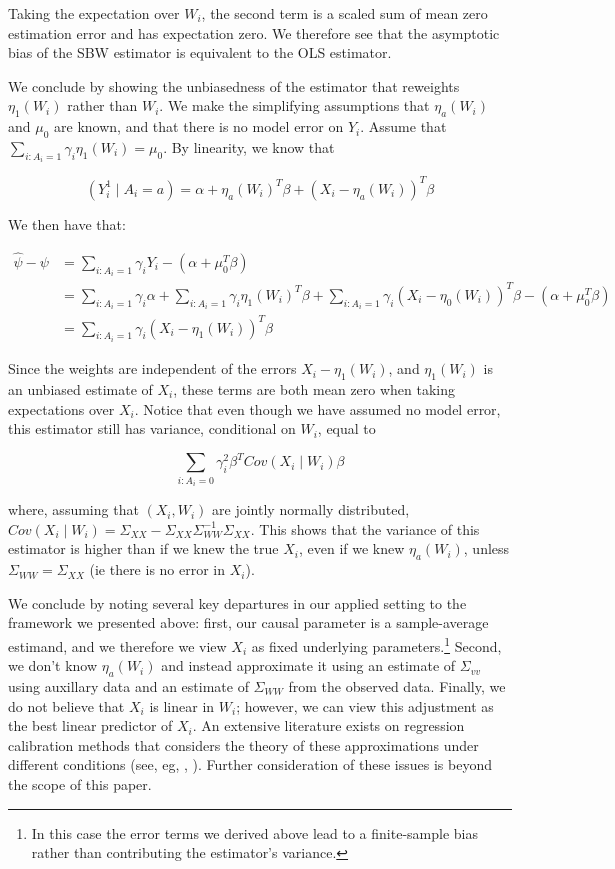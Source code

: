 \documentclass[12pt]{article}
\begin{document}
Taking the expectation over $W_i$, the second term is a scaled sum of mean zero estimation error and has expectation zero. We therefore see that the asymptotic bias of the SBW estimator is equivalent to the OLS estimator.

We conclude by showing the unbiasedness of the estimator that reweights $\eta_1(W_i)$ rather than $W_i$. We make the simplifying assumptions that $\eta_a(W_i)$ and $\mu_0$ are known, and that there is no model error on $Y_i$. Assume that $\sum_{i: A_i = 1}\gamma_i\eta_1(W_i) = \mu_0$. By linearity, we know that

$$
(Y_i^1 \mid A_i = a) = \alpha + \eta_a(W_i)^T\beta + (X_i - \eta_a(W_i))^T\beta
$$

We then have that:

\begin{align*}
    \hat{\psi} - \psi &= \sum_{i: A_i = 1}\gamma_iY_i - (\alpha + \mu_0^T\beta) \\
    &= \sum_{i: A_i = 1}\gamma_i\alpha + \sum_{i: A_i = 1}\gamma_i\eta_1(W_i)^T\beta + \sum_{i: A_i = 1}\gamma_i(X_i - \eta_0(W_i))^T\beta - (\alpha + \mu_0^T\beta) \\
    &= \sum_{i: A_i = 1}\gamma_i(X_i - \eta_1(W_i))^T\beta
\end{align*}

Since the weights are independent of the errors $X_i - \eta_1(W_i)$, and $\eta_1(W_i)$ is an unbiased estimate of $X_i$, these terms are both mean zero when taking expectations over $X_i$. Notice that even though we have assumed no model error, this estimator still has variance, conditional on $W_i$, equal to

$$
\sum_{i: A_i = 0} \gamma_i^2\beta^TCov(X_i \mid W_i)\beta
$$

where, assuming that $(X_i, W_i)$ are jointly normally distributed, $Cov(X_i \mid W_i) = \Sigma_{XX} - \Sigma_{XX}\Sigma_{WW}^{-1}\Sigma_{XX}$. This shows that the variance of this estimator is higher than if we knew the true $X_i$, even if we knew $\eta_a(W_i)$, unless $\Sigma_{WW} = \Sigma_{XX}$ (ie there is no error in $X_i$). 

We conclude by noting several key departures in our applied setting to the framework we presented above: first, our causal parameter is a sample-average estimand, and we therefore we view $X_i$ as fixed underlying parameters.\footnote{In this case the error terms we derived above lead to a finite-sample bias rather than contributing the estimator's variance.} Second, we don't know $\eta_a(W_i)$ and instead approximate it using an estimate of $\Sigma_{vv}$ using auxillary data and an estimate of $\Sigma_{WW}$ from the observed data. Finally, we do not believe that $X_i$ is linear in $W_i$; however, we can view this adjustment as the best linear predictor of $X_i$. An extensive literature exists on regression calibration methods that considers the theory of these approximations under different conditions (see, eg, \cite{gleser1992importance}, \cite{carroll2006measurement}). Further consideration of these issues is beyond the scope of this paper.

\cleardoublepage
 
\end{document}
